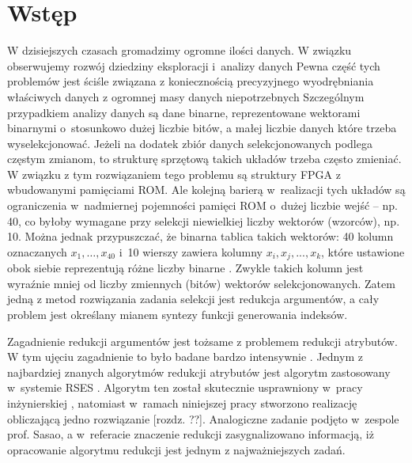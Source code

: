 \chapter{Wstęp}

W dzisiejszych czasach gromadzimy ogromne ilości danych.
W związku obserwujemy rozwój dziedziny eksploracji i~analizy danych
Pewna część tych problemów jest ściśle związana z koniecznością precyzyjnego wyodrębniania właściwych danych z ogromnej masy danych niepotrzebnych
Szczególnym przypadkiem analizy danych są dane binarne, reprezentowane wektorami binarnymi o~stosunkowo dużej liczbie bitów,
a małej liczbie danych które trzeba wyselekcjonować.
Jeżeli na dodatek zbiór danych selekcjonowanych podlega częstym zmianom,
to strukturę sprzętową takich układów trzeba często zmieniać.
W związku z tym rozwiązaniem tego problemu są struktury FPGA z wbudowanymi pamięciami ROM.
Ale kolejną barierą w~realizacji tych układów są ograniczenia w~nadmiernej pojemności pamięci ROM o~dużej liczbie wejść – np. 40,
co byłoby wymagane przy selekcji niewielkiej liczby wektorów (wzorców), np. 10.
Można jednak przypuszczać, że binarna tablica takich wektorów: 40 kolumn oznaczanych $x_1,…,x_{40}$ i~10 wierszy zawiera kolumny $x_i, x_j, ..., x_k$,
które ustawione obok siebie reprezentują różne liczby binarne \cite{sasao-workshop}.
Zwykle takich kolumn jest wyraźnie mniej od liczby zmiennych (bitów) wektorów selekcjonowanych.
Zatem jedną z metod rozwiązania zadania selekcji jest redukcja argumentów,
a cały problem jest określany mianem syntezy funkcji generowania indeksów.

Zagadnienie redukcji argumentów jest tożsame z problemem redukcji atrybutów.
W tym ujęciu zagadnienie to było badane bardzo intensywnie \cite{fast-algorithm, efektywna-procedura, new-reduction, steinbach-posthoff, skowron-rauszer, slezak, novel-method}.
Jednym z najbardziej znanych algorytmów redukcji atrybutów jest algorytm zastosowany w~systemie RSES \cite{rses}.
Algorytm ten został skutecznie usprawniony w~pracy inżynierskiej \cite{efektywna-procedura},
natomiast w~ramach niniejszej pracy stworzono realizację obliczającą jedno rozwiązanie [rozdz. ??].
Analogiczne zadanie podjęto w~zespole prof. Sasao,
a w~referacie \cite{sasao-workshop} znaczenie redukcji zasygnalizowano informacją,
iż opracowanie algorytmu redukcji jest jednym z najważniejszych zadań.

